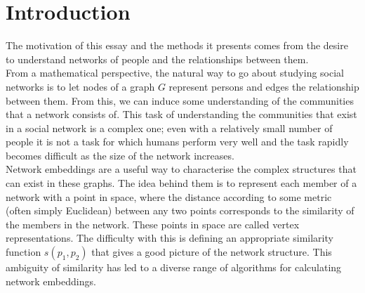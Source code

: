 \documentclass[a4paper]{article}
\begin{document}


\tableofcontents

\section{Introduction}
The motivation of this essay and the methods it presents comes from
the desire to understand networks of people and the relationships
between them.\\
From a mathematical perspective, the natural way to go about studying social
networks is to let nodes of a graph $G$ represent persons and edges
the relationship between them. From this, we can induce some understanding
of the communities that a network consists of. This task of understanding the
communities that exist in a social network is a complex one; even with a
relatively small number of people it is not a task for which humans perform very
well and the task rapidly becomes difficult as the size of the network
increases.\\
Network embeddings are a useful way to characterise the complex structures that
can exist in these graphs. The idea behind them is to represent each member of a
network with a point in space, where the distance according to some metric
(often simply Euclidean) between any two points corresponds to the similarity of
the members in the network. These points in space are called vertex
representations. The difficulty with this is defining an appropriate
similarity function $s(p_1, p_2)$ that gives a good picture of the network
structure. This ambiguity of similarity has led to a diverse range of algorithms
for calculating network embeddings.\\
\end{document}
